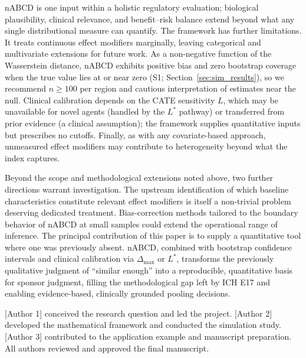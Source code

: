 \documentclass[AMA,Times1COL]{WileyNJDv5}
\begin{document}
nABCD is one input within a holistic regulatory evaluation; biological plausibility, clinical relevance, and benefit--risk balance extend beyond what any single distributional measure can quantify.\cite{iche17,matsushima2024} The framework has further limitations. It treats continuous effect modifiers marginally, leaving categorical and multivariate extensions for future work. As a non-negative function of the Wasserstein distance, nABCD exhibits positive bias and zero bootstrap coverage when the true value lies at or near zero (S1; Section~\ref{sec:sim_results}),\cite{andrews2000} so we recommend $n \geq 100$ per region and cautious interpretation of estimates near the null. Clinical calibration depends on the CATE sensitivity $L$, which may be unavailable for novel agents (handled by the $L^*$ pathway) or transferred from prior evidence (a clinical assumption); the framework supplies quantitative inputs but prescribes no cutoffs. Finally, as with any covariate-based approach, unmeasured effect modifiers may contribute to heterogeneity beyond what the index captures.

Beyond the scope and methodological extensions noted above, two further directions warrant investigation. The upstream identification of which baseline characteristics constitute relevant effect modifiers is itself a non-trivial problem deserving dedicated treatment. Bias-correction methods tailored to the boundary behavior of nABCD at small samples could extend the operational range of inference. The principal contribution of this paper is to supply a quantitative tool where one was previously absent. nABCD, combined with bootstrap confidence intervals and clinical calibration via $\Delta_{\max}$ or $L^*$, transforms the previously qualitative judgment of ``similar enough'' into a reproducible, quantitative basis for sponsor judgment, filling the methodological gap left by ICH E17 and enabling evidence-based, clinically grounded pooling decisions.



[Author 1] conceived the research question and led the project. [Author 2] developed the mathematical framework and conducted the simulation study. [Author 3] contributed to the application example and manuscript preparation. All authors reviewed and approved the final manuscript.
\end{document}
